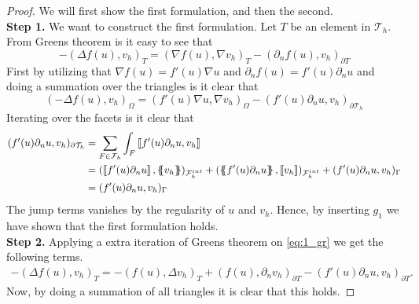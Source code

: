 \begin{proof}

    We will first show the first formulation, and then the second.
        \\ \textbf{Step 1.}  We want to construct the first formulation. Let $T$ be an element in $\mathcal{T}_{h}$. From Greens theorem is it easy to see that
            \begin{equation}
            \label{eq:1_gr}
-(\Delta f( u) , v_{h})_{T } = (\nabla f( u), \nabla v_{h}  )_{T } - ( \partial _{n}  f( u), v_{h} )_{\partial T }
            \end{equation}
            First by utilizing that $\nabla f( u) = f' ( u) \nabla u $ and $\partial _{n}f( u)  = f' ( u)  \partial _{n}u$  and doing a summation over the triangles  is it clear that \[
            ( -\Delta f( u),v_{h} )_{\Omega  } =(f' ( u) \nabla u, \nabla v_{h}  )_{\Omega  } - (   f' ( u)\partial _{n}u, v_{h} )_{\partial \mathcal{T}_{h}  }
            \]
            Iterating over the facets is it clear that \[
                \begin{split}
            (   f' ( u)\partial _{n}u, v_{h} )_{\partial \mathcal{T}_{h}  } & = \sum_{F \in \mathcal{F}_{h}  }^{} \int_{F}^{}   \jump{ f' ( u)\partial _{n}u, v_{h} } \\
                                                                        & =  ( \jump{ f' ( u) \partial _{n}u },  \mean{v_{h}}    )_{\mathcal{F}^{int}_{h} } + ( \mean{ f' ( u) \partial _{n}u }, \jump{ v_{h} }    )_{\mathcal{F}^{int}_{h} } +  ( f' ( u)
                                                                        \partial _{n}u, v_{h}) _{\Gamma } \\
                                                                        & =  ( f' ( u) \partial _{n}u, v_{h}) _{\Gamma }
                \end{split}
            \]
            The jump terms vanishes by the regularity of $u$ and $v_{h}$. Hence, by inserting $g_{1}$ we have shown that the first formulation holds.
         \\ \textbf{Step 2.}  Applying a extra iteration of Greens theorem on \eqref{eq:1_gr} we get the following terms.
\[
    \begin{split}
-(\Delta f( u) , v_{h})_{T }  = -( f( u), \Delta v_{h} )_{T} + (f( u), \partial _{n} v_{h}  )_{\partial T} - (   f'( u)\partial _{n}u, v_{h} )_{\partial T } .
    \end{split}
\]
Now, by doing a summation of all triangles it is clear that this holds.

\end{proof}
